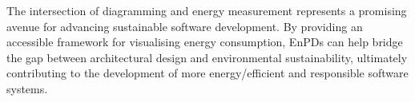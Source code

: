 The intersection of diagramming and energy measurement represents a promising avenue for advancing sustainable software development.
By providing an accessible framework for visualising energy consumption, EnPDs can help bridge the gap between architectural design and environmental sustainability, ultimately contributing to the development of more energy\-/efficient and responsible software systems.
